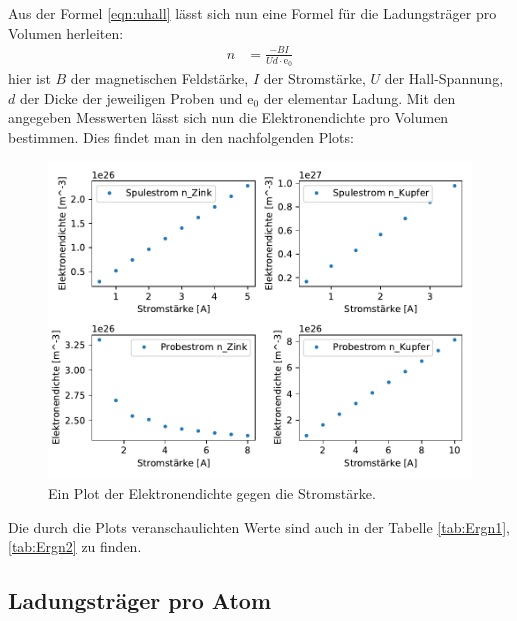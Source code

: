    \noindent
    Aus der Formel \ref{eqn:uhall} lässt sich nun eine Formel für die Ladungsträger pro Volumen herleiten:
    \begin{align}
        n &= \frac{-BI}{Ud\cdot\text{e}_0} \nonumber
    \end{align}
    hier ist $B$ der magnetischen Feldstärke, $I$ der Stromstärke, $U$ der Hall-Spannung, $d$ der Dicke der jeweiligen Proben und $\text{e}_0$ der 
    elementar Ladung.
    \noindent
    Mit den angegeben Messwerten lässt sich nun die Elektronendichte pro Volumen bestimmen. Dies findet man in den nachfolgenden Plots:
    \begin{figure}[H]
        \centering
        \includegraphics[width=1.1\textwidth]{build/N.pdf}
        \caption{Ein Plot der Elektronendichte gegen die Stromstärke.}
        \label{img:elekdichte}
    \end{figure}
    \noindent
    Die durch die Plots veranschaulichten Werte sind auch in der Tabelle \ref{tab:Ergn1},\ref{tab:Ergn2} zu finden.


    \subsection{Ladungsträger pro Atom}


